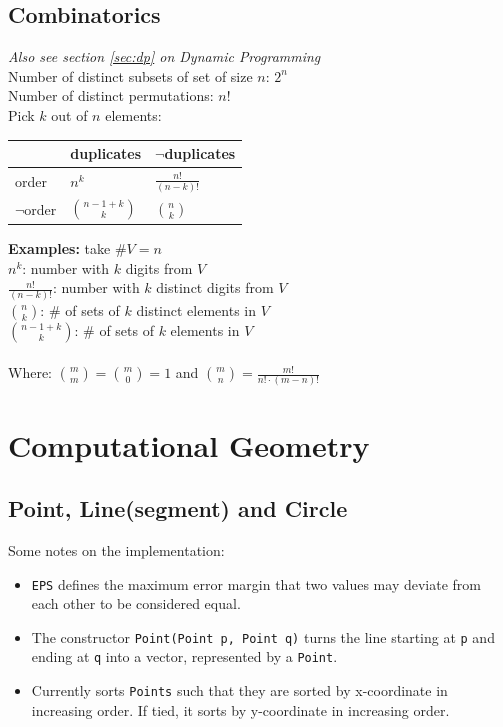 \documentclass[a4paper,10pt]{article}
\begin{document}
\begin{multicols}{2}
\subsection{Combinatorics}
\textit{Also see section \ref{sec:dp} on Dynamic Programming}\\
Number of distinct subsets of set of size $n$: $2^n$\\
Number of distinct permutations: $n!$\\
Pick $k$ out of $n$ elements:
\vspace{-10pt}\begin{table}[H]
\bgroup
\def\arraystretch{1.4}%
\begin{tabular}{l|l|l}
&duplicates&$\lnot$duplicates\\\hline
order&$n^k$&$\frac{n!}{(n-k)!}$\\\hline
$\lnot$order&$\binom{n-1+k}{k}$&$\binom{n}{k}$\\
\end{tabular}
\egroup
\end{table}\vspace{-10pt}
\noindent\textbf{Examples:} take $\#V=n$\\
$n^k$: number with $k$ digits from $V$\\
$\frac{n!}{(n-k)!}$: number with $k$ distinct digits from $V$\\
$ \binom{n}{k}$: \# of sets of $k$ distinct elements in $V$\\
$\binom{n-1+k}{k}$: \# of sets of $k$ elements in $V$\\\\
Where: $\binom{m}{m}=\binom{m}{0}=1$ and $\binom{m}{n}=\frac{m!}{n!\cdot(m-n)!}$


\section{Computational Geometry}
\subsection{Point, Line(segment) and Circle}
Some notes on the implementation:
\begin{itemize}[nolistsep,noitemsep]
\itemsep0em
\item \lstinline|EPS| defines the maximum error margin that two values may deviate from each other to be considered equal.
\item The constructor \lstinline|Point(Point p, Point q)| turns the line starting at \lstinline|p| and ending at \lstinline|q| into a vector, represented by a \lstinline|Point|.
\item Currently sorts \lstinline|Points| such that they are sorted by x-coordinate in increasing order. If tied, it sorts by y-coordinate in increasing order.
\end{itemize}


\end{multicols}
\end{document}
